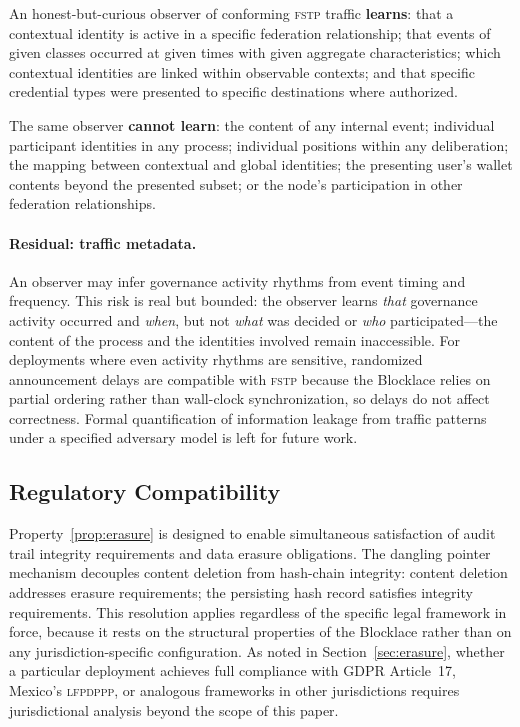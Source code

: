 \documentclass[12pt]{article}
\newcommand{\FSTP}{\textsc{fstp}}
\begin{document}
	An honest-but-curious observer of conforming \FSTP{} traffic
	\textbf{learns}: that a contextual identity is active in a specific
	federation relationship; that events of given classes occurred at
	given times with given aggregate characteristics; which contextual
	identities are linked within observable contexts; and that specific
	credential types were presented to specific destinations where
	authorized.
	
	The same observer \textbf{cannot learn}: the content of any internal
	event; individual participant identities in any process; individual
	positions within any deliberation; the mapping between contextual and
	global identities; the presenting user's wallet contents beyond the
	presented subset; or the node's participation in other federation
	relationships.
	
	\paragraph{Residual: traffic metadata.}
	
	An observer may infer governance activity rhythms from event timing
	and frequency. This risk is real but bounded: the observer learns
	\emph{that} governance activity occurred and \emph{when}, but not
	\emph{what} was decided or \emph{who} participated---the content of
	the process and the identities involved remain inaccessible. For
	deployments where even activity rhythms are sensitive, randomized
	announcement delays are compatible with \FSTP{} because the Blocklace
	relies on partial ordering rather than wall-clock synchronization, so
	delays do not affect correctness. Formal quantification of information
	leakage from traffic patterns under a specified adversary model is
	left for future work.
	
	\subsection{Regulatory Compatibility}
	
	Property~\ref{prop:erasure} is designed to enable simultaneous
	satisfaction of audit trail integrity requirements and data erasure
	obligations. The dangling pointer mechanism decouples content deletion
	from hash-chain integrity: content deletion addresses erasure
	requirements; the persisting hash record satisfies integrity
	requirements. This resolution applies regardless of the specific legal
	framework in force, because it rests on the structural properties of
	the Blocklace rather than on any jurisdiction-specific configuration.
	As noted in Section~\ref{sec:erasure}, whether a particular deployment
	achieves full compliance with GDPR Article~17, Mexico's
	\textsc{lfpdppp}, or analogous frameworks in other jurisdictions
	requires jurisdictional analysis beyond the scope of this paper.
	
\end{document}
